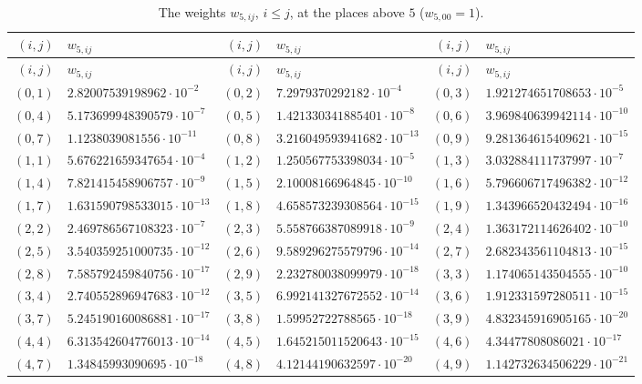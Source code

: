 {\footnotesize
\begin{longtable}{rlrlrl}
\caption{The weights $w_{5,ij}$, $i\le j$, at the places above $5$ ($w_{5,00}=1$).}\label{fw-data:5}\\
\toprule
$(i,j)$ & $w_{5,ij}$ & $(i,j)$ & $w_{5,ij}$ & $(i,j)$ & $w_{5,ij}$\\
\midrule
\endfirsthead
\toprule
$(i,j)$ & $w_{5,ij}$ & $(i,j)$ & $w_{5,ij}$ & $(i,j)$ & $w_{5,ij}$\\
\midrule
\endhead
$(0,1)$ & $2.82007539198962\cdot10^{-2}$ & $(0,2)$ & $7.2979370292182\cdot10^{-4}$ & $(0,3)$ & $1.921274651708653\cdot10^{-5}$\\
$(0,4)$ & $5.173699948390579\cdot10^{-7}$ & $(0,5)$ & $1.421330341885401\cdot10^{-8}$ & $(0,6)$ & $3.969840639942114\cdot10^{-10}$\\
$(0,7)$ & $1.1238039081556\cdot10^{-11}$ & $(0,8)$ & $3.216049593941682\cdot10^{-13}$ & $(0,9)$ & $9.281364615409621\cdot10^{-15}$\\
$(1,1)$ & $5.676221659347654\cdot10^{-4}$ & $(1,2)$ & $1.250567753398034\cdot10^{-5}$ & $(1,3)$ & $3.032884111737997\cdot10^{-7}$\\
$(1,4)$ & $7.821415458906757\cdot10^{-9}$ & $(1,5)$ & $2.10008166964845\cdot10^{-10}$ & $(1,6)$ & $5.796606717496382\cdot10^{-12}$\\
$(1,7)$ & $1.631590798533015\cdot10^{-13}$ & $(1,8)$ & $4.658573239308564\cdot10^{-15}$ & $(1,9)$ & $1.343966520432494\cdot10^{-16}$\\
$(2,2)$ & $2.469786567108323\cdot10^{-7}$ & $(2,3)$ & $5.558766387089918\cdot10^{-9}$ & $(2,4)$ & $1.363172114626402\cdot10^{-10}$\\
$(2,5)$ & $3.540359251000735\cdot10^{-12}$ & $(2,6)$ & $9.589296275579796\cdot10^{-14}$ & $(2,7)$ & $2.682343561104813\cdot10^{-15}$\\
$(2,8)$ & $7.585792459840756\cdot10^{-17}$ & $(2,9)$ & $2.232780038099979\cdot10^{-18}$ & $(3,3)$ & $1.174065143504555\cdot10^{-10}$\\
$(3,4)$ & $2.740552896947683\cdot10^{-12}$ & $(3,5)$ & $6.992141327672552\cdot10^{-14}$ & $(3,6)$ & $1.912331597280511\cdot10^{-15}$\\
$(3,7)$ & $5.245190160086881\cdot10^{-17}$ & $(3,8)$ & $1.59952722788565\cdot10^{-18}$ & $(3,9)$ & $4.832345916905165\cdot10^{-20}$\\
$(4,4)$ & $6.313542604776013\cdot10^{-14}$ & $(4,5)$ & $1.645215011520643\cdot10^{-15}$ & $(4,6)$ & $4.34477808086021\cdot10^{-17}$\\
$(4,7)$ & $1.34845993090695\cdot10^{-18}$ & $(4,8)$ & $4.12144190632597\cdot10^{-20}$ & $(4,9)$ & $1.142732634506229\cdot10^{-21}$\\

\end{longtable}}
